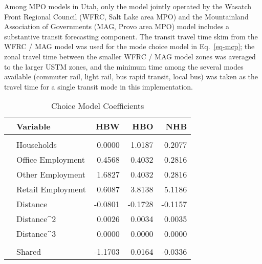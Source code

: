 \documentclass[]{ascelike-new}
\begin{document}
Among MPO models in Utah, only the model jointly operated by the Wasatch
Front Regional Council (WFRC, Salt Lake area MPO) and the Mountainland
Association of Governments (MAG, Provo area MPO) model includes a
substantive transit forecasting component. The transit travel time skim
from the WFRC / MAG model was used for the mode choice model in
Eq.~\ref{eq-mcp}; the zonal travel time between the smaller WFRC / MAG
model zones was averaged to the larger USTM zones, and the minimum time
among the several modes available (commuter rail, light rail, bus rapid
transit, local bus) was taken as the travel time for a single transit
mode in this implementation.

\hypertarget{tbl-coeffs}{}
\begin{table}
\caption{\label{tbl-coeffs}Choice Model Coefficients }\tabularnewline

\centering
\begin{tabular}[t]{llrrr}
\toprule
 & Variable & HBW & HBO & NHB\\
\midrule
\addlinespace[0.3em]
\multicolumn{5}{l}{\textbf{Destination Choice}}\\
\hspace{1em} & Households & 0.0000 & 1.0187 & 0.2077\\

\hspace{1em} & Office Employment & 0.4568 & 0.4032 & 0.2816\\

\hspace{1em} & Other Employment & 1.6827 & 0.4032 & 0.2816\\

\hspace{1em} & Retail Employment & 0.6087 & 3.8138 & 5.1186\\

\hspace{1em} & Distance & -0.0801 & -0.1728 & -0.1157\\

\hspace{1em} & Distance\textasciicircum{}2 & 0.0026 & 0.0034 & 0.0035\\

\hspace{1em} & Distance\textasciicircum{}3 & 0.0000 & 0.0000 & 0.0000\\
\cmidrule{1-5}
\addlinespace[0.3em]
\multicolumn{5}{l}{\textbf{Mode Choice}}\\
\hspace{1em} & Shared & -1.1703 & 0.0164 & -0.0336\\


\end{tabular}
\end{table}
\end{document}
